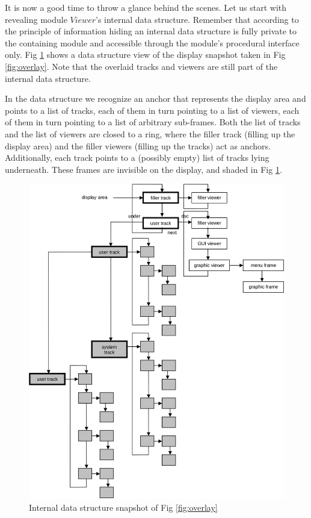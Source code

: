 It is now a good time to throw a glance behind the scenes. Let us start with revealing module
$Viewer$’s internal data structure. Remember that according to the principle of information hiding an
internal data structure is fully private to the containing module and accessible through the
module’s procedural interface only. Fig \ref{fig:snapshot} shows a data structure view of the display snapshot
taken in Fig \ref{fig:overlay}. Note that the overlaid tracks and viewers are still part of the internal data structure.

In the data structure we recognize an anchor that represents the display area and points to a list
of tracks, each of them in turn pointing to a list of viewers, each of them in turn pointing to a list of
arbitrary sub-frames. Both the list of tracks and the list of viewers are closed to a ring, where the
filler track (filling up the display area) and the filler viewers (filling up the tracks) act as anchors.
Additionally, each track points to a (possibly empty) list of tracks lying underneath. These frames
are invisible on the display, and shaded in Fig \ref{fig:snapshot}.
\begin{figure}
	\centering
	\includegraphics[width=\textwidth]{i/9}
	\caption{Internal data structure snapshot of Fig \ref{fig:overlay}}
	\label{fig:snapshot}
\end{figure}

